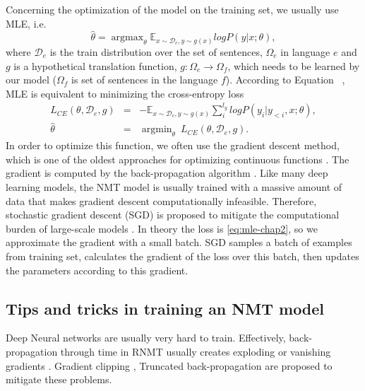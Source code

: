 Concerning the optimization of the model on the training set, we usually use MLE, i.e.
\begin{equation}
\hat{\theta} = \displaystyle{\mathop{argmax}_{\theta}\mathbb{E}_{x \sim \mathcal{D}_e, y \sim g(x)}}log P(y|x;\theta),
\label{eq:mle-chap2}
\end{equation}
where $\mathcal{D}_e$ is the train distribution over the set of sentences, $\Omega_e$ in language $e$ and $g$ is a hypothetical translation function, $g:\Omega_e \rightarrow \Omega_f$, which needs to be learned by our model ($\Omega_f$ is set of sentences in the language $f$). According to Equation ~, MLE is equivalent to minimizing the cross-entropy loss
\begin{equation}
\begin{array}{rcl}
L_{CE}(\theta, \mathcal{D}_e, g) &=& -\displaystyle{\mathbb{E}_{x \sim \mathcal{D}_e, y \sim g(x)} \mathop{\sum}_{i}^{l_y}}log P(y_i|y_{<i},x;\theta), \\
\hat{\theta} &=& \displaystyle{\mathop{argmin}_{\theta}} \ L_{CE}(\theta,\mathcal{D}_e,g).
\end{array}
\label{eq:ce-chap2}
\end{equation}
In order to optimize this function, we often use the gradient descent method, which is one of the oldest approaches for optimizing continuous functions \citep{Cauchy1847method}. The gradient is computed by the back-propagation algorithm \citep{Rumelhart88learning}. Like many deep learning models, the NMT model is usually trained with a massive amount of data that makes gradient descent computationally infeasible. Therefore, stochastic gradient descent (SGD) is proposed to mitigate the computational burden of large-scale models \citep{Herbert51stochastic,Kiefer52stochastic,Bottou10large}. In theory the loss is \eqref{eq:mle-chap2}, so we approximate the gradient with a small batch. SGD samples a batch of examples from training set, calculates the gradient of the loss over this batch, then updates the parameters according to this gradient.
\subsection{Tips and tricks in training an NMT model}
Deep Neural networks are usually very hard to train. Effectively, back-propagation through time in RNMT usually creates exploding or vanishing gradients \citep{Glorot10understanding,Pascanu13onthe}. Gradient clipping \citep{Pascanu13onthe}, Truncated back-propagation \citep{Jaeger02tutorial} are proposed to mitigate these problems.

